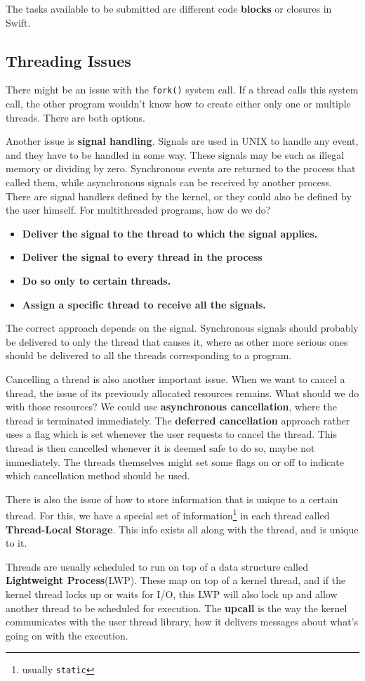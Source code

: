 \documentclass{tufte-handout}
\begin{document}
The tasks available to be submitted are different code \textbf{blocks} or closures in Swift.

\subsection{Threading Issues}
There might be an issue with the \texttt{fork()} system call. If a thread calls this system call,
the other program wouldn't know how to create either only one or multiple threads. There are
both options.

Another issue is \textbf{signal handling}. Signals are used in UNIX to handle any event, and 
they have to be handled in some way. These signals may be such as illegal memory or dividing by 
zero. Synchronous events are returned to the process that called them, while asynchronous 
signals can be received by another process. There are signal handlers defined by the 
kernel, or they could also be defined by the user himself. For multithreaded programs,
how do we do?

\begin{itemize}
	\item \textbf{Deliver the signal to the thread to which the signal applies.}
	\item \textbf{Deliver the signal to every thread in the process}
	\item \textbf{Do so only to certain threads.}
	\item \textbf{Assign a specific thread to receive all the signals.}
\end{itemize}

The correct approach depends on the signal. Synchronous signals should probably be delivered
to only the thread that causes it, where as other more serious ones should be delivered to 
all the threads corresponding to a program.

Cancelling a thread is also another important issue. When we want to cancel a thread,
the issue of its previously allocated resources remains. What should we do with those 
resources? We could use \textbf{asynchronous cancellation}, where the thread is 
terminated immediately. The \textbf{deferred cancellation} approach rather uses 
a flag which is set whenever the user requests to cancel the thread. This 
thread is then cancelled whenever it is deemed safe to do so, maybe not immediately.
The threads themselves might set some flags on or off to indicate which cancellation 
method should be used.

There is also the issue of how to store information that is unique to a certain thread.
For this, we have a special set of information\footnote{usually \texttt{static}}
in each thread called \textbf{Thread-Local Storage}. This info exists all along 
with the thread, and is unique to it.

Threads are usually scheduled to run on top of a data structure called 
\textbf{Lightweight Process}(LWP). These map on top of a kernel thread, and if the 
kernel thread locks up or waits for I/O, this LWP will also lock up and allow
another thread to be scheduled for execution. The \textbf{upcall} is the way
the kernel communicates with the user thread library, how it delivers messages 
about what's going on with the execution.
\end{document}
